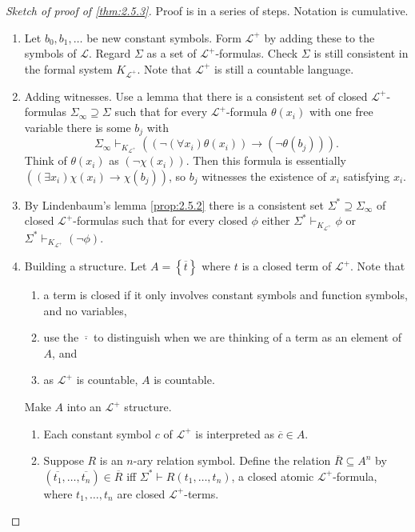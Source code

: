 \documentclass{article}
\renewcommand{\L}{\mathcal{L}}
\newcommand{\rb}[1]{\left( #1 \right)}
\newcommand{\cb}[1]{\left\{ #1 \right\}}
\newcommand{\notb}[1]{\rb{\neg #1}}
\newcommand{\impb}[2]{\rb{#1 \rightarrow #2}}
\newcommand{\fab}[1]{\rb{\forall #1}}
\newcommand{\teb}[1]{\rb{\exists #1}}
\theoremstyle{definition}\newtheorem{definition}{Definition}[subsection]
\theoremstyle{definition}\newtheorem{remark}[definition]{Remark}
\theoremstyle{definition}\newtheorem*{example}{Example}
\theoremstyle{definition}\newtheorem*{note}{Note}
\begin{document}
\begin{proof}[Sketch of proof of \ref{thm:2.5.3}]
Proof is in a series of steps. Notation is cumulative.
\begin{enumerate}
\item Let $ b_0, b_1, \dots $ be new constant symbols. Form $ \L^+ $ by adding these to the symbols of $ \L $. Regard $ \Sigma $ as a set of $ \L^+ $-formulas. Check $ \Sigma $ is still consistent in the formal system $ K_{\L^+} $. Note that $ \L^+ $ is still a countable language.
\item Adding witnesses. Use a lemma that there is a consistent set of closed $ \L^+ $-formulas $ \Sigma_\infty \supseteq \Sigma $ such that for every $ \L^+ $-formula $ \theta\rb{x_i} $ with one free variable there is some $ b_j $ with
$$ \Sigma_\infty \vdash_{K_{\L^+}} \impb{\notb{\fab{x_i}\theta\rb{x_i}}}{\notb{\theta\rb{b_j}}}. $$
Think of $ \theta\rb{x_i} $ as $ \notb{\chi\rb{x_i}} $. Then this formula is essentially $ \impb{\teb{x_i}\chi\rb{x_i}}{\chi\rb{b_j}} $, so $ b_j $ witnesses the existence of $ x_i $ satisfying $ x_i $.
\item By Lindenbaum's lemma \ref{prop:2.5.2} there is a consistent set $ \Sigma^* \supseteq \Sigma_\infty $ of closed $ \L^+ $-formulas such that for every closed $ \phi $ either $ \Sigma^* \vdash_{K_{\L^+}} \phi $ or $ \Sigma^* \vdash_{K_{\L^+}} \notb{\phi} $.
\item Building a structure. Let $ A = \cb{\overline{t}} $ where $ t $ is a closed term of $ \L^+ $. Note that
\begin{enumerate}
\item a term is closed if it only involves constant symbols and function symbols, and no variables,
\item use the $ \overline{\cdot} $ to distinguish when we are thinking of a term as an element of $ A $, and
\item as $ \L^+ $ is countable, $ A $ is countable.
\end{enumerate}
Make $ A $ into an $ \L^+ $ structure.
\begin{enumerate}
\item Each constant symbol $ c $ of $ \L^+ $ is interpreted as $ \overline{c} \in A $.
\item Suppose $ R $ is an $ n $-ary relation symbol. Define the relation $ \overline{R} \subseteq A^n $ by $ \rb{\overline{t_1}, \dots, \overline{t_n}} \in \overline{R} $ iff $ \Sigma^* \vdash R\rb{t_1, \dots, t_n} $, a closed atomic $ \L^+ $-formula, where $ t_1, \dots, t_n $ are closed $ \L^+ $-terms.

\end{enumerate}
\end{enumerate}
\end{proof}
\end{document}
